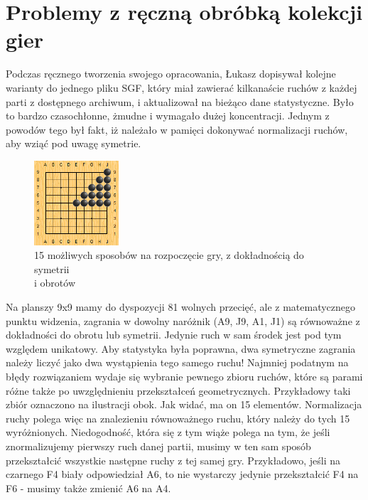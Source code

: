 \documentclass[11pt,leqno]{article}
\begin{document}
\section{Problemy z ręczną obróbką kolekcji gier}

Podczas ręcznego tworzenia swojego opracowania, Łukasz dopisywał kolejne warianty do jednego pliku SGF, który miał 
zawierać kilkanaście ruchów z każdej parti z dostępnego archiwum, i aktualizował na bieżąco dane statystyczne. Było to bardzo 
czasochłonne, żmudne i wymagało dużej koncentracji. Jednym z powodów tego był fakt, iż należało w pamięci dokonywać normalizacji
 ruchów, aby wziąć pod uwagę symetrie. 

\begin{figure}
  \vspace{-20pt}
  \begin{center}
    \includegraphics[width=0.28\textwidth]{symetria.png}
  \end{center}
  \vspace{-20pt}
  \caption{15 możliwych sposobów na rozpoczęcie gry, z dokładnością do symetrii \\i obrotów}
  \vspace{-10pt}
\end{figure}

Na planszy 9x9 mamy do dyspozycji 81 wolnych przecięć, ale z matematycznego punktu widzenia, zagrania w dowolny naróżnik 
(A9, J9, A1, J1) są równoważne z dokładności do obrotu lub symetrii. Jedynie ruch w sam środek jest pod tym względem unikatowy. 
Aby statystyka była poprawna, dwa symetryczne zagrania należy liczyć jako dwa wystąpienia tego samego ruchu! Najmniej podatnym
 na błędy rozwiązaniem wydaje się wybranie pewnego zbioru ruchów, które są parami różne także po uwzględnieniu przekształceń 
geometrycznych. Przykładowy taki zbiór oznaczono na ilustracji obok. Jak widać, ma on 15 elementów. Normalizacja ruchy polega
 więc na znalezieniu równoważnego ruchu, który należy do tych 15 wyróżnionych. Niedogodność, która się z tym wiąże polega na 
tym, że jeśli znormalizujemy pierwszy ruch danej partii, musimy w ten sam sposób przekształcić wszystkie następne ruchy z tej samej gry. 
Przykładowo, jeśli na czarnego F4 biały odpowiedział A6, to nie wystarczy jedynie przekształcić
F4 na F6 - musimy także zmienić A6 na A4.
\end{document}
